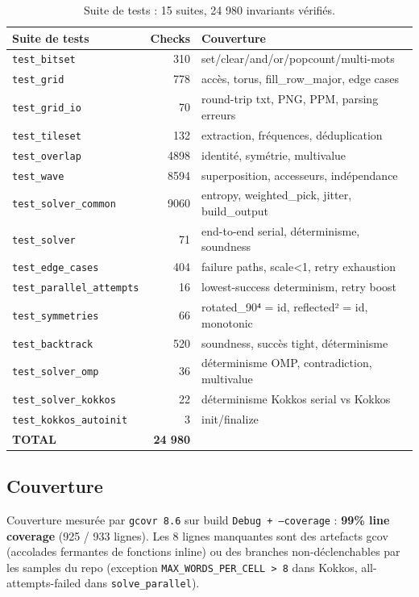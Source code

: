 \begin{table}[H]
\centering
\begin{tabularx}{\textwidth}{lrl}
\toprule
\textbf{Suite de tests} & \textbf{Checks} & \textbf{Couverture} \\
\midrule
\texttt{test\_bitset} & 310 & set/clear/and/or/popcount/multi-mots \\
\texttt{test\_grid} & 778 & accès, torus, fill\_row\_major, edge cases \\
\texttt{test\_grid\_io} & 70 & round-trip txt, PNG, PPM, parsing erreurs \\
\texttt{test\_tileset} & 132 & extraction, fréquences, déduplication \\
\texttt{test\_overlap} & 4898 & identité, symétrie, multivalue \\
\texttt{test\_wave} & 8594 & superposition, accesseurs, indépendance \\
\texttt{test\_solver\_common} & 9060 & entropy, weighted\_pick, jitter, build\_output \\
\texttt{test\_solver} & 71 & end-to-end serial, déterminisme, soundness \\
\texttt{test\_edge\_cases} & 404 & failure paths, scale<1, retry exhaustion \\
\texttt{test\_parallel\_attempts} & 16 & lowest-success determinism, retry boost \\
\texttt{test\_symmetries} & 66 & rotated\_90⁴ = id, reflected² = id, monotonic \\
\texttt{test\_backtrack} & 520 & soundness, succès tight, déterminisme \\
\texttt{test\_solver\_omp} & 36 & déterminisme OMP, contradiction, multivalue \\
\texttt{test\_solver\_kokkos} & 22 & déterminisme Kokkos serial vs Kokkos \\
\texttt{test\_kokkos\_autoinit} & 3 & init/finalize \\
\midrule
\textbf{TOTAL} & \textbf{24 980} & \\
\bottomrule
\end{tabularx}
\caption{Suite de tests : 15 suites, 24 980 invariants vérifiés.}
\label{tab:res:tests}
\end{table}

\subsection{Couverture}

Couverture mesurée par \texttt{gcovr 8.6} sur build \texttt{Debug + --coverage} : \textbf{99\% line coverage} (925 / 933 lignes). Les 8 lignes manquantes sont des artefacts gcov (accolades fermantes de fonctions inline) ou des branches non-déclenchables par les samples du repo (exception \texttt{MAX\_WORDS\_PER\_CELL > 8} dans Kokkos, all-attempts-failed dans \texttt{solve\_parallel}).

